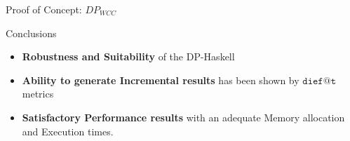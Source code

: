 
\begin{frame}[fragile]{Proof of Concept: $DP_{WCC}$}
  \begin{block}{Conclusions}      

  \begin{itemize}
    \setlength\itemsep{2em}
    \item \textbf{Robustness and Suitability} of the DP-Haskell 
    \item \textbf{Ability to generate Incremental results} has been shown by $\mathtt{dief@t}$ metrics
    \item \textbf{Satisfactory Performance results} with an adequate Memory allocation and Execution times. 
  \end{itemize}
\end{block}
\end{frame}

